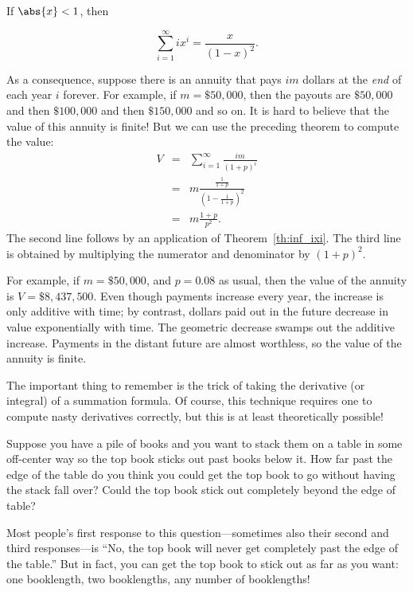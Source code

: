 \begin{theorem}
\label{th:inf_ixi}
If $\abs{x} < 1$, then

\[
\sum_{i=1}^\infty i x^i = \frac{x}{(1-x)^2}.
\]
\end{theorem}

As a consequence, suppose there is an annuity that pays $im$ dollars
at the {\em end} of each year $i$ forever.  For example, if $m =
\$50,000$, then the payouts are $\$50,000$ and then $\$100,000$ and
then $\$150,000$ and so on.  It is hard to believe that the value of
this annuity is finite!  But we can use the preceding theorem to
compute the value:
\begin{eqnarray*}
V & = & \sum_{i=1}^\infty \frac{im}{(1+p)^i} \\
  & = & m \frac{\frac{1}{1+p}}{(1 - \frac{1}{1+p})^2} \\
  & = & m \frac{1+p}{p^2}.
\end{eqnarray*}
The second line follows by an application of Theorem~\ref{th:inf_ixi}.
The third line is obtained by multiplying the numerator and
denominator by $(1+p)^2$.

For example, if $m = \$50,000$, and $p = 0.08$ as usual, then the
value of the annuity is $V = \$8,437,500$.  Even though payments
increase every year, the increase is only additive with time; by
contrast, dollars paid out in the future decrease in value
exponentially with time.  The geometric decrease swamps out the
additive increase.  Payments in the distant future are almost
worthless, so the value of the annuity is finite.

The important thing to remember is the trick of taking the derivative
(or integral) of a summation formula.  Of course, this technique
requires one to compute nasty derivatives correctly, but this is at
least theoretically possible!
\fi


\label{book_stacking_sec}

Suppose you have a pile of books and you want to stack them on a table in
some off-center way so the top book sticks out past books below it.  How
far past the edge of the table do you think you could get the top book to
go without having the stack fall over?  Could the top book stick out
completely beyond the edge of table?

Most people's first response to this question---sometimes also their
second and third responses---is ``No, the top book will never get
completely past the edge of the table.''  But in fact, you can get the top
book to stick out as far as you want: one booklength, two booklengths, any
number of booklengths!

